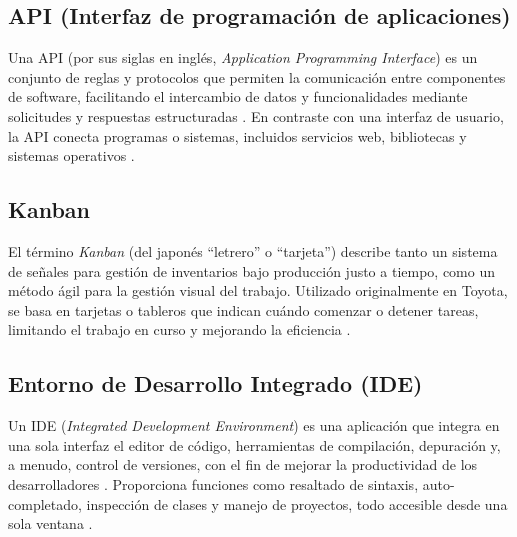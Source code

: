 \documentclass[12pt]{article}
\begin{document}
	\subsection{API (Interfaz de programación de aplicaciones)}

	\hspace{1.27cm}Una API (por sus siglas en inglés, \emph{Application Programming Interface}) es un conjunto de reglas y protocolos que permiten la comunicación entre componentes de software, facilitando el intercambio de datos y funcionalidades mediante solicitudes y respuestas estructuradas \parencite{aws_api,oracle_api}. En contraste con una interfaz de usuario, la API conecta programas o sistemas, incluidos servicios web, bibliotecas y sistemas operativos \parencite{wikipedia_api}.

	\subsection{Kanban}

	\hspace{1.27cm}El término \emph{Kanban} (del japonés “letrero” o “tarjeta”) describe tanto un sistema de señales para gestión de inventarios bajo producción justo a tiempo, como un método ágil para la gestión visual del trabajo. Utilizado originalmente en Toyota, se basa en tarjetas o tableros que indican cuándo comenzar o detener tareas, limitando el trabajo en curso y mejorando la eficiencia \parencite{wikipedia_kanban_dev,asana_kanban}.

	\subsection{Entorno de Desarrollo Integrado (IDE)}

	\hspace{1.27cm}Un IDE (\emph{Integrated Development Environment}) es una aplicación que integra en una sola interfaz el editor de código, herramientas de compilación, depuración y, a menudo, control de versiones, con el fin de mejorar la productividad de los desarrolladores \parencite{eswiki_ide,geeksforgeeks_ide}. Proporciona funciones como resaltado de sintaxis, auto-completado, inspección de clases y manejo de proyectos, todo accesible desde una sola ventana \parencite{eswiki_ide}.

	\printbibliography
\end{document}
